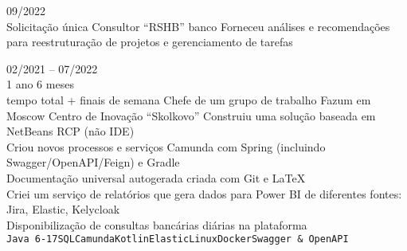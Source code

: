 


\begin{entrylist}
    \entry
    {09/2022\\\footnotesize{Solicitação única}}
    {Consultor}
    {\enquote{RSHB} banco}
    {
        Forneceu análises e recomendações para reestruturação de projetos e gerenciamento de tarefas
    }

    \entry
    {02/2021 -- 07/2022\\\footnotesize{1 ano 6 meses\\tempo total + finais de semana}}
    {Chefe de um grupo de trabalho}
    {Fazum em Moscow Centro de Inovação \enquote{Skolkovo}}
    {
        Construiu uma solução baseada em NetBeans RCP (não IDE) \\
    Criou novos processos e serviços Camunda com Spring (incluindo Swagger/OpenAPI/Feign) e Gradle \\
    Documentação universal autogerada criada com Git e LaTeX \\
    Criei um serviço de relatórios que gera dados para Power BI de diferentes fontes: Jira, Elastic, Kelycloak \\
    Disponibilização de consultas bancárias diárias na plataforma \\
    \texttt{Java 6-17}\slashsep\texttt{SQL}\slashsep\texttt{Camunda}\slashsep\texttt{Kotlin}\slashsep\texttt{Elastic}\slashsep\texttt{Linux}\slashsep\texttt{Docker}\slashsep\texttt{Swagger \& OpenAPI}
    }


\end{entrylist}

